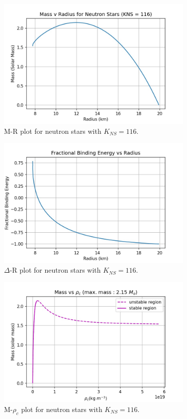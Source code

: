 \documentclass[a4paper]{article}
\begin{document}
\begin{enumerate}[label=(\alph*)]
\begin{enumerate}[label=(\alph*)]
        \begin{figure}[H] 
        \centering
        \includegraphics[width=0.85\textwidth]{NS_DatvPrd_116.jpg}
        \caption{M-R plot for neutron stars with $K_{NS} = 116$.}
        \end{figure} 
        
        \begin{figure}[H] 
        \centering
        \includegraphics[width=0.85\textwidth]{NS_FBE_116.jpg}
        \caption{$\Delta$-R plot for neutron stars with $K_{NS} = 116$.}
        \end{figure} 
        
        
        \begin{figure}[H] 
        \centering
        \includegraphics[width=0.85\textwidth]{NS_rho_116.jpg}
        \caption{M-$\rho_{c}$ plot for neutron stars with $K_{NS} = 116$.}
        \end{figure} 
        

\end{enumerate}
\end{enumerate}
\end{document}
